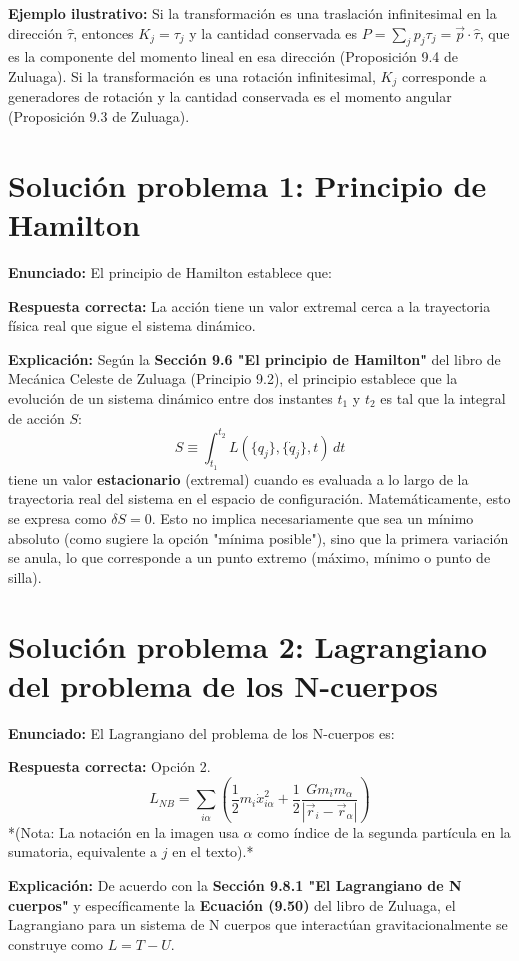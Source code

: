 \documentclass[a4paper]{article}
\begin{document}
\textbf{Ejemplo ilustrativo:} Si la transformación es una traslación infinitesimal en la dirección $\hat{\tau}$, entonces $K_j = \tau_j$ y la cantidad conservada es $P = \sum_j p_j \tau_j = \vec{p} \cdot \hat{\tau}$, que es la componente del momento lineal en esa dirección (Proposición 9.4 de Zuluaga). Si la transformación es una rotación infinitesimal, $K_j$ corresponde a generadores de rotación y la cantidad conservada es el momento angular (Proposición 9.3 de Zuluaga).


\section{Solución problema 1: Principio de Hamilton}

\textbf{Enunciado:} El principio de Hamilton establece que:

\textbf{Respuesta correcta:} La acción tiene un valor extremal cerca a la trayectoria física real que sigue el sistema dinámico.

\textbf{Explicación:}
Según la \textbf{Sección 9.6 "El principio de Hamilton"} del libro de Mecánica Celeste de Zuluaga (Principio 9.2), el principio establece que la evolución de un sistema dinámico entre dos instantes $t_1$ y $t_2$ es tal que la integral de acción $S$:
$$S \equiv \int_{t_1}^{t_2} L(\{q_j\}, \{\dot{q}_j\}, t) \, dt$$
tiene un valor \textbf{estacionario} (extremal) cuando es evaluada a lo largo de la trayectoria real del sistema en el espacio de configuración. Matemáticamente, esto se expresa como $\delta S = 0$. Esto no implica necesariamente que sea un mínimo absoluto (como sugiere la opción "mínima posible"), sino que la primera variación se anula, lo que corresponde a un punto extremo (máximo, mínimo o punto de silla).

\section{Solución problema 2: Lagrangiano del problema de los N-cuerpos}

\textbf{Enunciado:} El Lagrangiano del problema de los N-cuerpos es:

\textbf{Respuesta correcta:} Opción 2.
$$L_{NB} = \sum_{i\alpha} \left( \frac{1}{2} m_i \dot{x}_{i\alpha}^2 + \frac{1}{2} \frac{G m_i m_\alpha}{|\vec{r}_i - \vec{r}_\alpha|} \right)$$
*(Nota: La notación en la imagen usa $\alpha$ como índice de la segunda partícula en la sumatoria, equivalente a $j$ en el texto).*

\textbf{Explicación:}
De acuerdo con la \textbf{Sección 9.8.1 "El Lagrangiano de N cuerpos"} y específicamente la \textbf{Ecuación (9.50)} del libro de Zuluaga, el Lagrangiano para un sistema de N cuerpos que interactúan gravitacionalmente se construye como $L = T - U$.
\end{document}
